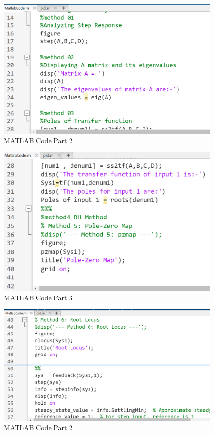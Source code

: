 \documentclass{article}
\begin{document}
\begin{figure}[h!]
	\centering
	\includegraphics[scale=0.75]{images/MatlabCode2.png}
	\caption{MATLAB Code Part 2}
	\label{fig:MatlabCode2}
\end{figure}

\begin{figure}[h!]
	\centering
	\includegraphics[scale=0.75]{images/MatlabCode3.png}
	\caption{MATLAB Code Part 3}
	\label{fig:MatlabCode3}
\end{figure}

\begin{figure}[h!]
	\centering
	\includegraphics[scale=0.75]{images/MatlabCode4.png}
	\caption{MATLAB Code Part 2}
	\label{fig:MatlabCode4}
\end{figure}
\end{document}
